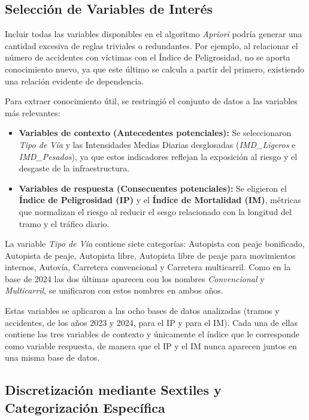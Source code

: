 \documentclass[twoside,a4paper,12pt,onecolumn,openany]{book}
\begin{document}
\subsection{Selección de Variables de Interés}

Incluir todas las variables disponibles en el algoritmo \textit{Apriori} podría generar una cantidad excesiva de reglas triviales o redundantes. Por ejemplo, al relacionar el número de accidentes con víctimas con el Índice de Peligrosidad, no se aporta conocimiento nuevo, ya que este último se calcula a partir del primero, existiendo una relación evidente de dependencia.

Para extraer conocimiento útil, se restringió el conjunto de datos a las variables más relevantes:
\begin{itemize}
    \item \textbf{Variables de contexto (Antecedentes potenciales):} Se seleccionaron \textit{Tipo de Vía} y las Intensidades Medias Diarias desglosadas (\textit{IMD\_Ligeros} e \textit{IMD\_Pesados}), ya que estos indicadores reflejan la exposición al riesgo y el desgaste de la infraestructura.
    
    \item \textbf{Variables de respuesta (Consecuentes potenciales):} Se eligieron el \textbf{Índice de Peligrosidad (IP)} y el \textbf{Índice de Mortalidad (IM)}, métricas que normalizan el riesgo al reducir el sesgo relacionado con la longitud del tramo y el tráfico diario.
\end{itemize}

La variable \textit{Tipo de Vía} contiene siete categorías: Autopista con peaje bonificado, Autopista de peaje, Autopista libre, Autopista libre de peaje para movimientos internos, Autovía, Carretera convencional y Carretera multicarril. Como en la base de 2024 las dos últimas aparecen con los nombres \textit{Convencional} y \textit{Multicarril}, se unificaron con estos nombres en ambos años.

\vspace{0.5cm}

Estas variables se aplicaron a las ocho bases de datos analizadas (tramos y accidentes, de los años 2023 y 2024, para el IP y para el IM). Cada una de ellas contiene las tres variables de contexto y únicamente el índice que le corresponde como variable respuesta, de manera que el IP y el IM nunca aparecen juntos en una misma base de datos.

\subsection{Discretización mediante Sextiles y Categorización Específica}
\end{document}
